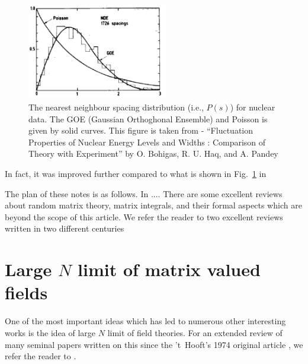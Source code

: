 \documentclass[11pt]{article}
\begin{document}
\begin{figure}[htbp] 
	\centering 
	\includegraphics[width=0.55\textwidth]{figs/data_exp.png}
	\caption{\label{fig:data_exp1}The nearest neighbour spacing distribution (i.e., $P(s)$) for nuclear data. The GOE (Gaussian Orthoghonal Ensemble) and Poisson is given by solid curves. This figure is taken from - ``Fluctuation Properties of Nuclear Energy Levels and Widths : Comparison of Theory with Experiment'' by O. Bohigas, R. U. Haq, and A. Pandey}
\end{figure}
In fact, it was improved further compared to what is shown in Fig.~\ref{fig:data_exp1} in 
\cite{PhysRevLett.48.1086} 
 
 
 The plan of these notes is as follows. In ....
 There are some excellent reviews about random matrix theory, matrix integrals, and their formal aspects which are beyond the scope of this article. We refer the reader to two excellent reviews written in two different centuries \cite{DiFrancesco:1993cyw,Eynard:2015aea}


\section{Large $N$ limit of matrix valued fields} 

One of the most important ideas which has led to numerous other interesting works is the idea of large $N$ limit of field theories. 
For an extended review of many seminal papers written on this since the 't~Hooft's 1974 original article \cite{tHooft:1973alw}, we refer the reader to \cite{Brezin:1994eb}.  
\end{document}
